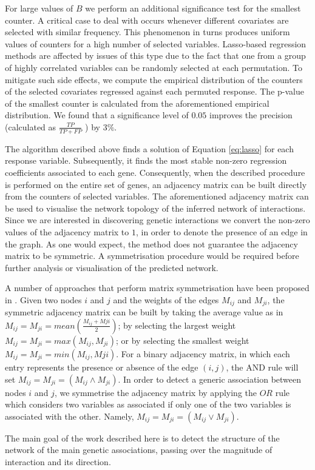 For large values of $B$ we perform an additional significance test for the smallest  counter. A critical case to deal with occurs whenever different covariates are selected with similar frequency. This phenomenon in turns produces uniform values of counters for a high number of selected variables. Lasso-based regression methods are affected by issues of this type due to the fact that one from a group of highly correlated variables can be randomly selected at each permutation. To mitigate such side effects, we compute the empirical distribution of the counters of the selected covariates regressed against each permuted response. The p-value of the smallest counter is calculated from the aforementioned empirical distribution. We found that a significance level of $0.05$ improves the precision (calculated as $\frac{TP}{TP+FP}$ ) by $3\%$.

The algorithm described above finds a solution of Equation \ref{eq:lasso} for each response variable. Subsequently, it finds the most stable non-zero regression coefficients associated to each gene. 
Consequently, when the described procedure is performed on the entire set of genes, an adjacency matrix can be built directly from the counters of selected variables. The aforementioned adjacency matrix can be used to visualise the network topology of the inferred network of interactions. 
Since we are interested in discovering genetic interactions we convert the non-zero values of the adjacency matrix to $1$, in order to denote the presence of an edge in the graph.
As one would expect, the method does not guarantee the adjacency matrix to be symmetric. A symmetrisation procedure would be required before further analysis or visualisation of the predicted network. 

A number of approaches that perform matrix symmetrisation have been proposed in \citealp{wna}. Given two nodes $i$ and $j$ and the weights of the edges $M_{ij}$ and $M_{ji}$, the symmetric adjacency matrix can be built by taking the average value as in $M_{ij} = M_{ji} = mean(\frac{M_{ij}+M{ji}}{2})$; by selecting the largest weight $M_{ij} = M_{ji} = max(M_{ij}, M_{ji})$; or by selecting the smallest weight  $M_{ij} = M_{ji} = min(M_{ij}, M{ji})$. 
For a binary adjacency matrix, in which each entry represents the presence or absence of the edge $(i,j)$, the AND rule will set $M_{ij} = M_{ji} = (M_{ij} \land M_{ji})$.
In order to detect a generic association between nodes $i$ and $j$, we symmetrise the adjacency matrix by applying the $OR$ rule which considers two variables as associated if only one of the two variables is associated with the other. Namely,
$M_{ij} = M_{ji} = (M_{ij} \vee M_{ji})$.

The main goal of the work described here is to detect the structure of the network of the main genetic associations, passing over the magnitude of interaction and its direction. 

